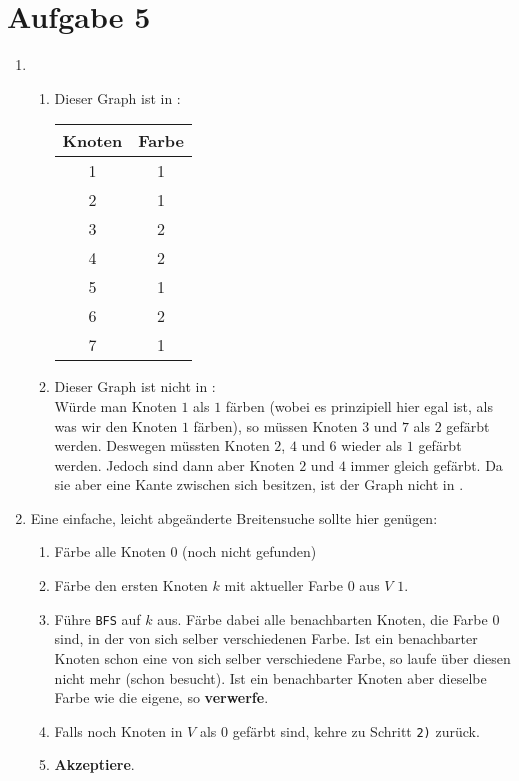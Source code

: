 \documentclass[a4paper,11pt]{scrartcl}
\begin{document}
	\section*{Aufgabe 5}
	\begin{enumerate}[label=\alph*)]
	\item	
		\begin{enumerate}[label=\arabic*)]
		\item	Dieser Graph ist in :\\
			\begin{tabular}{c|c}
			Knoten & Farbe\\
			\hline
			1 & 1\\
			2 & 1\\
			3 & 2\\
			4 & 2\\
			5 & 1\\
			6 & 2\\
			7 & 1\\
			\end{tabular}
		\item	Dieser Graph ist nicht in :\\
				Würde man Knoten $1$ als $1$ färben (wobei es prinzipiell hier egal ist, als was wir den Knoten $1$ färben), so müssen Knoten $3$ und $7$ als $2$ gefärbt werden. Deswegen müssten Knoten $2$, $4$ und $6$ wieder als $1$ gefärbt werden. Jedoch sind dann aber Knoten $2$ und $4$ immer gleich gefärbt. Da sie aber eine Kante zwischen sich besitzen, ist der Graph nicht in .
		\end{enumerate}
		
	\item	Eine einfache, leicht abgeänderte Breitensuche sollte hier genügen:
		\begin{enumerate}[label=\arabic*)]
		\item Färbe alle Knoten $0$ (noch nicht gefunden)
		\item Färbe den ersten Knoten $k$ mit aktueller Farbe $0$ aus $V$ $1$.
		\item Führe \verb|BFS| auf $k$ aus. Färbe dabei alle benachbarten Knoten, die Farbe $0$ sind, in der von sich selber verschiedenen Farbe. Ist ein benachbarter Knoten schon eine von sich selber verschiedene Farbe, so laufe über diesen nicht mehr (schon besucht). Ist ein benachbarter Knoten aber dieselbe Farbe wie die eigene, so \textbf{verwerfe}.
		\item Falls noch Knoten in $V$ als $0$ gefärbt sind, kehre zu Schritt \verb|2)| zurück.
		\item \textbf{Akzeptiere}.
		\end{enumerate}
		

\end{enumerate}
\end{document}
